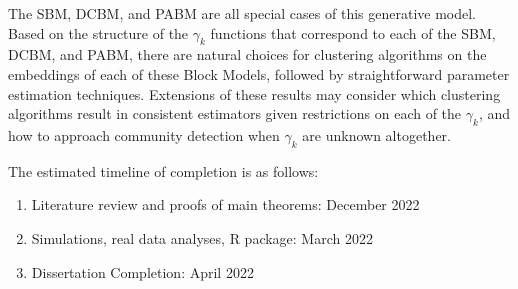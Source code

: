 \documentclass[
  11pt,
]{article}
\begin{document}
The SBM, DCBM, and PABM are all special cases of this generative model.
Based on the structure of the \(\gamma_k\) functions that correspond to
each of the SBM, DCBM, and PABM, there are natural choices for
clustering algorithms on the embeddings of each of these Block Models,
followed by straightforward parameter estimation techniques. Extensions
of these results may consider which clustering algorithms result in
consistent estimators given restrictions on each of the \(\gamma_k\),
and how to approach community detection when \(\gamma_k\) are unknown
altogether.

The estimated timeline of completion is as follows:

\begin{enumerate}
\def\labelenumi{\arabic{enumi}.}
\item
  Literature review and proofs of main theorems: December 2022
\item
  Simulations, real data analyses, R package: March 2022
\item
  Dissertation Completion: April 2022
\end{enumerate}

  
\end{document}
